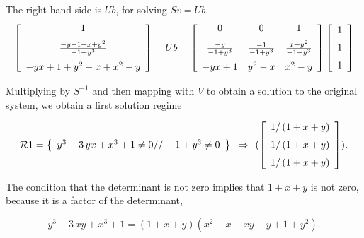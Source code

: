\documentclass[10pt]{article}
\begin{document}
The right hand side is $Ub$, for solving $Sv = Ub$.
\[
\left [\begin {array}{c} 1\\\noalign{\medskip}
{\frac {-y-1+x+y^2}{-1+{y}^{3}}}\\\noalign{\medskip}
-yx+1+{y}^{2}-x+{x}^{2}-y\end {array}\right ]
= Ub =
\left [\begin {array}{ccc} 
0&0&1\\\noalign{\medskip}
{\frac {-y}{-1+{y}^{3}}}&{\frac {-1}{-1+{y}^{3}}}&{\frac {x+{y}^{2}}{-1+{y}^{3}}}\\\noalign{\medskip}
-yx+1&{y}^{2}-x&{x}^{2}-y\end {array}\right ]
\left [\begin {array}{c} 1\\\noalign{\medskip}1\\\noalign{\medskip}1
\end {array}\right ]
\]

Multiplying by $S^{-1}$ and then mapping with $V$ to obtain a solution to the
original system,  we obtain a first solution regime


\[\RR1 =  
\breg {y}^{3}-3\,yx+{x}^{3}+1\neq 0//-1+{y}^{3}\neq 0\ereg \implies
(
\left [\begin {array}{c}1/ \left (1+x+y\right )\\\noalign{\medskip}
1/ \left (1+x+y\right )\\\noalign{\medskip}
1/ \left (1+x+y\right )
\end {array}\right ]
).
\]

The condition that the determinant is not zero implies that 
$1 + x + y$ is not zero, because it is a factor of the determinant,

\[
{y}^{3}-3\,xy+{x}^{3}+1 = 
(1 + x + y) (x^2  - x - x y - y + 1 + y^2 ).
\]
\end{document}
